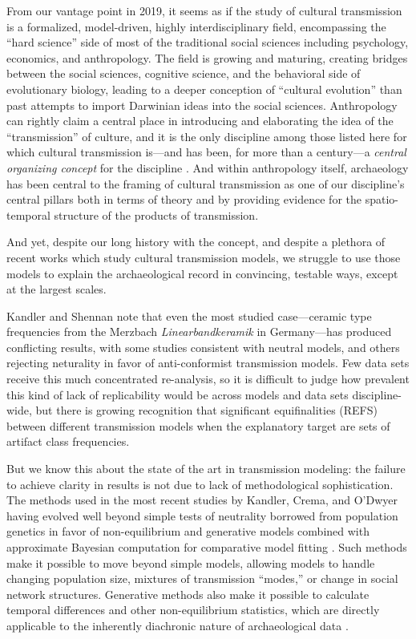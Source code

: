 From our vantage point in 2019, it seems as if the study of cultural transmission is a formalized, model-driven, highly interdisciplinary field, encompassing the ``hard science'' side of most of the traditional social sciences including psychology, economics, and anthropology.  The field is growing and maturing, creating bridges between the social sciences, cognitive science, and the behavioral side of evolutionary biology, leading to a deeper conception of ``cultural evolution'' than past attempts to import Darwinian ideas into the social sciences.  Anthropology can rightly claim a central place in introducing and elaborating the idea of the ``transmission'' of culture, and it is the only discipline among those listed here for which cultural transmission is---and has been, for more than a century---a \emph{central organizing concept} for the discipline \citep{lyman2008cultural}.  And within anthropology itself, archaeology has been central to the framing of cultural transmission as one of our discipline's central pillars both in terms of theory and by providing evidence for the spatio-temporal structure of the products of transmission.

And yet, despite our long history with the concept, and despite a plethora of recent works which study cultural transmission models, we struggle to use those models to explain the archaeological record in convincing, testable ways, except at the largest scales.  


Kandler and Shennan \citeyearpar{Kandler20150905} note that even the most studied case---ceramic type frequencies from the Merzbach \emph{Linearbandkeramik} in Germany---has produced conflicting results, with some studies consistent with neutral models, and others rejecting neturality in favor of anti-conformist transmission models.  Few data sets receive this much concentrated re-analysis, so it is difficult to judge how prevalent this kind of lack of replicability would be across models and data sets discipline-wide,  but there is growing recognition that significant equifinalities (REFS) between different transmission models when the explanatory target are sets of artifact class frequencies.  

But we know this about the state of the art in transmission modeling:  the failure to achieve clarity in results is not due to lack of methodological sophistication.  The methods used in the most recent studies by Kandler, Crema, and O'Dwyer having evolved well beyond simple tests of neutrality borrowed from population genetics in favor of non-equilibrium and generative models combined with approximate Bayesian computation for comparative model fitting \citep{kandler2018generative,kandler2019analysing}.  Such methods make it possible to move beyond simple models, allowing models to handle changing population size, mixtures of transmission ``modes,'' or change in social network structures.  Generative methods also make it possible to calculate temporal differences and other non-equilibrium statistics, which are directly applicable to the inherently diachronic nature of archaeological data \citep{kandler2013non}.  

